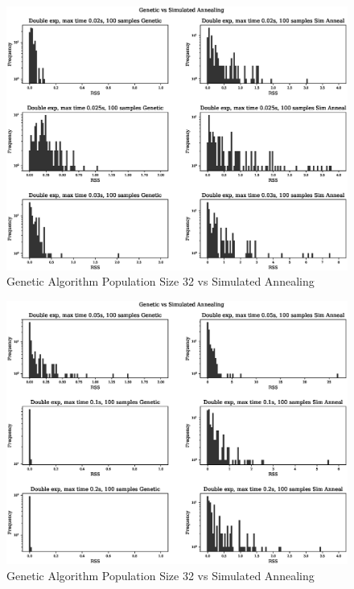 \begin{figure}[h]
  \begin{center}
    \includegraphics[width=15.0cm]{appendix/sim_anneal_genetic/pop_32/plot_name_10.eps}
    \caption{Genetic Algorithm Population Size 32 vs Simulated Annealing}
    \label{fig:ga_vs_sim_32_2}
  \end{center}
\end{figure}

\begin{figure}[h]
  \begin{center}
    \includegraphics[width=15.0cm]{appendix/sim_anneal_genetic/pop_32/plot_name_11.eps}
    \caption{Genetic Algorithm Population Size 32 vs Simulated Annealing}
    \label{fig:ga_vs_sim_32_3}
  \end{center}
\end{figure}


